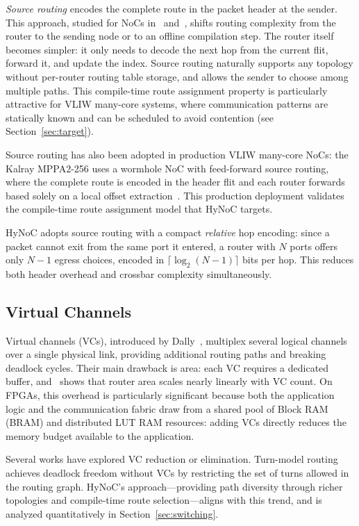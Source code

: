 \emph{Source routing} encodes the complete route in the packet header at the
sender. This approach, studied for NoCs in~\cite{liwei2007} and~\cite{mubeen2010},
shifts routing complexity from the router to the sending node or to an offline
compilation step. The router itself becomes simpler: it only needs to decode the
next hop from the current flit, forward it, and update the index. Source routing
naturally supports any topology without per-router routing table storage, and
allows the sender to choose among multiple paths. This compile-time route
assignment property is particularly attractive for VLIW many-core systems, where
communication patterns are statically known and can be scheduled to avoid
contention (see Section~\ref{sec:target}).

Source routing has also been adopted in production VLIW many-core NoCs: the
Kalray MPPA2-256 uses a wormhole NoC with feed-forward source routing, where the
complete route is encoded in the header flit and each router forwards based solely
on a local offset extraction~\cite{dinechin2017}. This production deployment
validates the compile-time route assignment model that HyNoC targets.

HyNoC adopts source routing with a compact \emph{relative} hop encoding: since a
packet cannot exit from the same port it entered, a router with $N$ ports offers
only $N-1$ egress choices, encoded in $\lceil\log_2(N-1)\rceil$ bits per hop.
This reduces both header overhead and crossbar complexity simultaneously.

\subsection{Virtual Channels}

Virtual channels (VCs), introduced by Dally~\cite{dally1992}, multiplex several
logical channels over a single physical link, providing additional routing paths
and breaking deadlock cycles. Their main drawback is area: each VC requires a
dedicated buffer, and~\cite{mello2005} shows that router area scales nearly
linearly with VC count. On FPGAs, this overhead is particularly significant
because both the application logic and the communication fabric draw from a shared
pool of Block RAM (BRAM) and distributed LUT RAM resources: adding VCs directly
reduces the memory budget available to the application.

Several works have explored VC reduction or elimination.
Turn-model routing~\cite{glass1992} achieves deadlock freedom without VCs by
restricting the set of turns allowed in the routing graph. HyNoC's
approach---providing path diversity through richer topologies and compile-time
route selection---aligns with this trend, and is analyzed quantitatively in
Section~\ref{sec:switching}.

